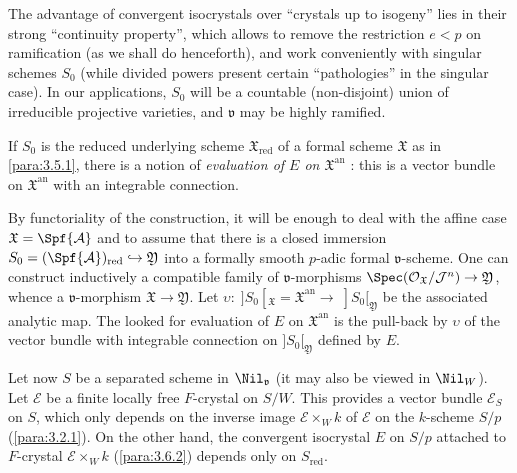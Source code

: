 \begin{para}\label{para:3.6.3} The advantage of convergent isocrystals over
 ``crystals up to isogeny'' lies in their strong 
``continuity property'', which allows to remove the restriction $e<p$ on
ramification (as we shall do henceforth), and work conveniently with
singular schemes $S_0$ (while divided powers present certain
``pathologies'' in the singular case). In our applications, $S_0$ will
be a countable (non-disjoint) union of irreducible projective varieties,
and $\mathfrak{v}$ may be highly ramified.
\end{para}

\begin{para}\label{para:3.6.4} If $S_0$ is the reduced underlying scheme 
 ${\mathfrak{X}}_{\mathrm{red}}$ of a formal scheme $\mathfrak{X}$ as in
 \ref{para:3.5.1}, there 
 is a notion of {\it evaluation of $E$ on $\mathfrak{X}^{\mathrm{an}}$}
 \cite[2.3.2]{crecrasp}: this is a vector bundle on
 ${\mathfrak{X}}^{\mathrm{an}}$ with an integrable connection. 
 

 By functoriality of the construction, it will be enough to deal with the
 affine case ${\mathfrak{X}}=\Spf{\mathcal{A}}$ and to assume that there
 is a closed immersion $S_0=(\Spf{\mathcal{A}})_{\mathrm{red}}\hookrightarrow
 \mathfrak{Y}$ into a formally smooth $p$-adic formal
 $\mathfrak{v}$-scheme. One can construct inductively a compatible family
 of $\mathfrak{v}$-morphisms
 $\Spec(\mathcal{O}_{\mathfrak{X}}/\mathcal{J}^n)\rightarrow \mathfrak{Y}$,
 whence a $\mathfrak{v}$-morphism  $\mathfrak{X} \rightarrow
 \mathfrak{Y}$.  Let $\upsilon :\; ]S_0[_{\mathfrak{X}} 
 ={\mathfrak{X}}^{\mathrm{an}}\rightarrow\; ]S_0[_{\mathfrak{Y}}$ be the
 associated analytic map. The looked for evaluation of $E$ on
 ${\mathfrak{X}}^{\mathrm{an}}$ 
 is the pull-back by $\upsilon$ of the vector bundle with integrable
 connection on $]S_0[_{\mathfrak{Y}}$ defined by $E$.
\end{para}

\begin{para}\label{para:3.6.5} Let now $S$ be a separated scheme in
 $\Nil_\mathfrak{v}$ (it may also be viewed in  $\Nil_W$).
 Let $\mathcal{E}$ be a finite locally free $F$-crystal on $S/W$. This
 provides a vector bundle $\mathcal{E}_S$ on $S$, which 
 only depends on the inverse image $\mathcal{E}\times_W k$ of
 $\mathcal{E}$ on the $k$-scheme $S/p$ (\cf \ref{para:3.2.1}). On the other 
 hand, the convergent isocrystal $E$ on $S/p$ attached to $F$-crystal
 $\mathcal{E}\times_W k$ (\cf \ref{para:3.6.2}) depends only on
 $S_{\mathrm{red}}$.
\end{para}

